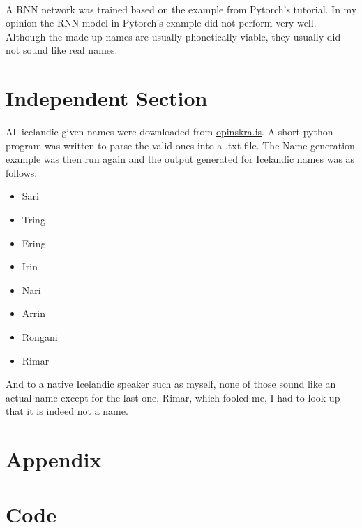 \documentclass{article}
\begin{document}
\\
A RNN network was trained based on the example from Pytorch's tutorial. In my opinion the RNN model in Pytorch's example did not perform very well. Although the made up names are usually phonetically viable, they usually did not sound like real names.

\newpage

\section*{Independent Section}
All icelandic given names were downloaded from \hyperlink{https://opingogn.is/dataset/mannanafnaskra/resource/27dc8c43-247e-4797-a603-87853637e038}{opinskra.is}. A short python program was written to parse the valid ones into a .txt file. The Name generation example was then run again and the output generated for Icelandic names was as follows:

\begin{itemize}
    \item Sari
    \item Tring
    \item Ering
    \item Irin
    \item Nari
    \item Arrin
    \item Rongani
    \item Rimar
\end{itemize}

And to a native Icelandic speaker such as myself, none of those sound like an actual name except for the last one, Rimar, which fooled me, I had to look up that it is indeed not a name.

\newpage
\section*{Appendix}
\appendix
\section{Code}


\end{document}
